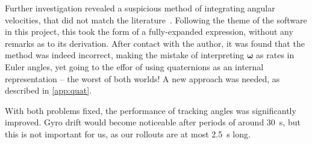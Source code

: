 \documentclass[main.tex]{subfiles}
\begin{document}
		Further investigation revealed a suspicious method of integrating angular velocities, that did not match the literature~\cite{boyle2016integration}.
		Following the theme of the software in this project, this took the form of a fully-expanded expression, without any remarks as to its derivation.
		After contact with the author, it was found that the method was indeed incorrect, making the mistake of interpreting $\bm{\omega}$ as rates in Euler angles, yet going to the effor of using quaternions as an internal representation -- the worst of both worlds! A new approach was needed, as described in \cref{app:quat}.

		With both problems fixed, the performance of tracking angles was significantly improved.
		Gyro drift would become noticeable after periods of around \SI{30}{\second}, but this is not important for us, as our rollouts are at most \SI{2.5}{\second} long.

\bib
\end{document}

